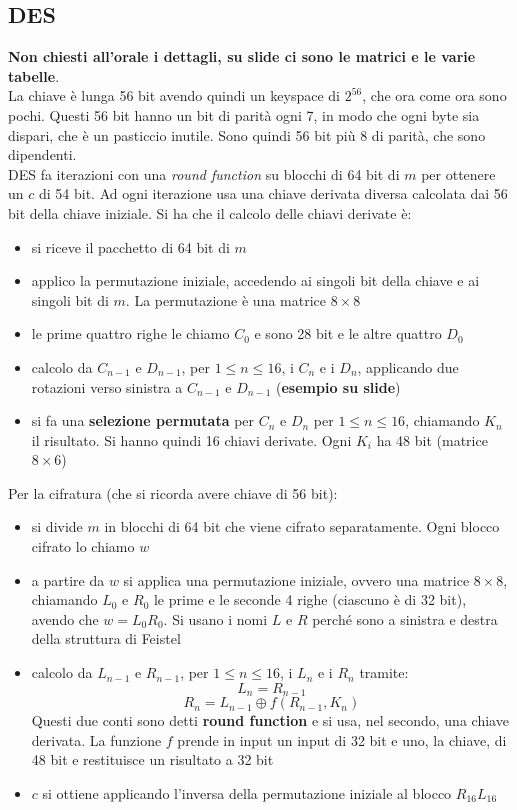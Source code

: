 \documentclass[a4paper,12pt, oneside]{book}
\begin{document}
\subsection{DES}
\textbf{Non chiesti all'orale i dettagli, su slide ci sono le matrici e le
  varie tabelle}.\\
La chiave è lunga 56 bit avendo quindi un keyspace di $2^{56}$, che ora come ora
sono pochi. Questi 56 bit hanno un bit di parità ogni 7, in modo che ogni byte
sia dispari, che è un pasticcio inutile. Sono quindi 56 bit più 8 di parità, che
sono dipendenti.\\
DES fa iterazioni con una \textit{round function} su blocchi di 64 bit di $m$
per ottenere un $c$ di 54 bit. Ad ogni iterazione usa una chiave derivata
diversa calcolata dai 56 bit della chiave iniziale. Si ha che il calcolo delle
chiavi derivate è:
\begin{itemize}
  \item si riceve il pacchetto di 64 bit di $m$
  \item applico la permutazione iniziale, accedendo ai singoli bit della chiave
  e ai singoli bit di $m$. La permutazione è una matrice $8\times 8$
  \item le prime quattro righe le chiamo $C_0$ e sono 28 bit e le altre quattro
  $D_0$ 
  \item calcolo da $C_{n-1}$ e $D_{n-1}$, per $1\leq n\leq 16$, i $C_n$ e i
  $D_n$, applicando due rotazioni verso sinistra a $C_{n-1}$ e $D_{n-1}$
  (\textbf{esempio su slide})
  \item si fa una \textbf{selezione permutata} per $C_n$ e $D_n$ per $1\leq
  n\leq 16$, chiamando $K_n$ il risultato. Si hanno quindi 16 chiavi
  derivate. Ogni $K_i$ ha 48 bit (matrice $8\times 6$)
\end{itemize}
Per la cifratura (che si ricorda avere chiave di 56 bit):
\begin{itemize}
  \item si divide $m$ in blocchi di 64 bit che viene cifrato separatamente. Ogni
  blocco cifrato lo chiamo $w$
  \item a partire da $w$ si applica una permutazione iniziale, ovvero una
  matrice $8\times 8$, chiamando $L_0$ e
  $R_0$ le prime e le seconde 4 righe (ciascuno è di 32 bit), avendo che
  $w=L_0R_0$. Si usano i nomi $L$ e $R$ perché sono a sinistra e destra della
  struttura di Feistel
  \item calcolo da $L_{n-1}$ e $R_{n-1}$, per $1\leq n\leq 16$, i $L_n$ e i
  $R_n$ tramite:
  \[L_n=R_{n-1}\]
  \[R_n=L_{n-1}\oplus f(R_{n-1},K_n)\]
  Questi due conti sono detti \textbf{round function} e si usa, nel secondo, una
  chiave derivata. La funzione $f$ prende in input un input di 32 bit e uno, la
  chiave, di 48 bit e restituisce un risultato a 32 bit
  \item $c$ si ottiene applicando l'inversa della permutazione iniziale al
  blocco $R_{16}L_{16}$ 
\end{itemize}
\end{document}
